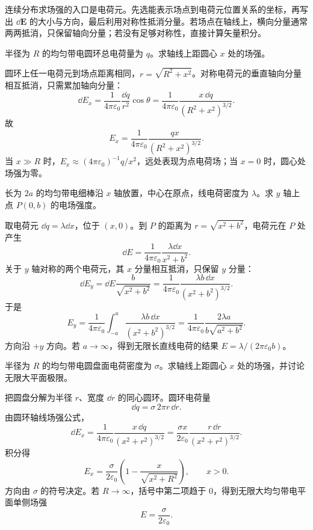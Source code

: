 \begin{method}[连续带电体场强积分]
连续分布求场强的入口是电荷元。先选能表示场点到电荷元位置关系的坐标，再写出 $\dd \bm E$ 的大小与方向，最后利用对称性抵消分量。若场点在轴线上，横向分量通常两两抵消，只保留轴向分量；若没有足够对称性，直接计算矢量积分。
\end{method}

\begin{example}[title={均匀带电圆环轴线上的电场}]\label{eg:ring-field}
半径为 $R$ 的均匀带电圆环总电荷量为 $q$。求轴线上距圆心 $x$ 处的场强。
\begin{solution}
圆环上任一电荷元到场点距离相同，$r=\sqrt{R^2+x^2}$。对称电荷元的垂直轴向分量相互抵消，只需累加轴向分量：
\[
  \dd E_x=\frac{1}{4\pi\varepsilon_0}\frac{\dd q}{r^2}\cos\theta
  =\frac{1}{4\pi\varepsilon_0}\frac{x\,\dd q}{(R^2+x^2)^{3/2}}.
\]
故
\[
  E_x=\frac{1}{4\pi\varepsilon_0}\frac{qx}{(R^2+x^2)^{3/2}}.
\]
当 $x\gg R$ 时，$E_x\approx (4\pi\varepsilon_0)^{-1}q/x^2$，远处表现为点电荷场；当 $x=0$ 时，圆心处场强为零。
\end{solution}
\end{example}

\begin{example}[title={有限长均匀带电直棒轴垂线上的场强}]\label{eg:finite-rod-field}
长为 $2a$ 的均匀带电细棒沿 $x$ 轴放置，中心在原点，线电荷密度为 $\lambda$。求 $y$ 轴上点 $P(0,b)$ 的电场强度。
\begin{solution}
取电荷元 $\dd q=\lambda\dd x$，位于 $(x,0)$。到 $P$ 的距离为 $r=\sqrt{x^2+b^2}$，电荷元在 $P$ 处产生
\[
  \dd E=\frac{1}{4\pi\varepsilon_0}\frac{\lambda\dd x}{x^2+b^2}.
\]
关于 $y$ 轴对称的两个电荷元，其 $x$ 分量相互抵消，只保留 $y$ 分量：
\[
  \dd E_y=\dd E\frac{b}{\sqrt{x^2+b^2}}
  =\frac{1}{4\pi\varepsilon_0}\frac{\lambda b\,\dd x}{(x^2+b^2)^{3/2}}.
\]
于是
\[
  E_y=\frac{1}{4\pi\varepsilon_0}\int_{-a}^{a}
  \frac{\lambda b\,\dd x}{(x^2+b^2)^{3/2}}
  =\frac{1}{4\pi\varepsilon_0}\frac{2\lambda a}{b\sqrt{a^2+b^2}}.
\]
方向沿 $+y$ 方向。若 $a\to\infty$，得到无限长直线电荷的结果 $E=\lambda/(2\pi\varepsilon_0 b)$。
\end{solution}
\end{example}

\begin{example}[title={均匀带电圆盘轴线上的场强}]\label{eg:charged-disk-field}
半径为 $R$ 的均匀带电圆盘面电荷密度为 $\sigma$。求轴线上距圆心 $x$ 处的场强，并讨论无限大平面极限。
\begin{solution}
把圆盘分解为半径 $r$、宽度 $\dd r$ 的同心圆环。圆环电荷量
\[
  \dd q=\sigma\,2\pi r\,\dd r.
\]
由圆环轴线场强公式，
\[
  \dd E_x=\frac{1}{4\pi\varepsilon_0}
  \frac{x\,\dd q}{(x^2+r^2)^{3/2}}
  =\frac{\sigma x}{2\varepsilon_0}\frac{r\,\dd r}{(x^2+r^2)^{3/2}}.
\]
积分得
\[
  E_x=\frac{\sigma}{2\varepsilon_0}\left(1-\frac{x}{\sqrt{x^2+R^2}}\right),
  \qquad x>0.
\]
方向由 $\sigma$ 的符号决定。若 $R\to\infty$，括号中第二项趋于 $0$，得到无限大均匀带电平面单侧场强
\[
  E=\frac{\sigma}{2\varepsilon_0}.
\]
\end{solution}
\end{example}

